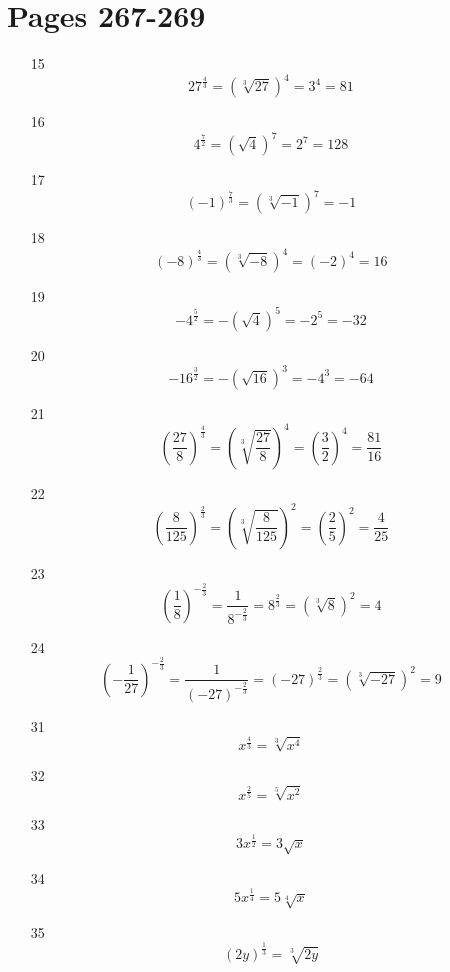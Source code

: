 \documentclass[fleqn,addpoints]{exam}
\begin{document}
\section{Pages 267-269}
\begin{itemize}

\item[15]
\[
  27^{\frac{4}{3}} = (\sqrt[3]{27})^4 = 3^4 = 81
\]

\item[16]
\[
  4^{\frac{7}{2}} = (\sqrt{4})^7 = 2^7 = 128
\]

\item[17]
\[
  (-1)^{\frac{7}{3}} = (\sqrt[3]{-1})^7= -1
\]

\item[18]
\[
  (-8)^{\frac{4}{3}} = (\sqrt[3]{-8})^4 = (-2)^4 = 16
\]

\item[19]
\[
  -4^{\frac{5}{2}} = -(\sqrt{4})^5 = -2^5 = -32
\]

\item[20]
\[
  -16^{\frac{3}{2}} = -(\sqrt{16})^3 = -4^3 = -64
\]

\item[21]
\[
  \left( \frac{27}{8} \right)^{\frac{4}{3}} = \left( \sqrt[3]{\frac{27}{8}} \right)^4 = \left( \frac{3}{2} \right)^4 = \frac{81}{16}
\]

\item[22]
\[
  \left( \frac{8}{125} \right)^{\frac{2}{3}} = \left( \sqrt[3]{\frac{8}{125}} \right)^2 = \left( \frac{2}{5} \right)^2 = \frac{4}{25}
\]

\item[23]
\[
  \left( \frac{1}{8} \right)^{-\frac{2}{3}} = \frac{1}{8^{-\frac{2}{3}} } = 8^{\frac{2}{3}} = (\sqrt[3]{8})^2 = 4
\]

\item[24]
\[
  \left( - \frac{1}{27} \right)^{-\frac{2}{3}} = \frac{1}{(-27)^{-\frac{2}{3}} } = (-27)^{\frac{2}{3}} = (\sqrt[3]{-27})^2 = 9
\]

\item[31]
\[
  x^{\frac{4}{3}} = \sqrt[3]{x^4}
\]

\item[32]
\[
  x^{\frac{2}{5}} = \sqrt[5]{x^2}
\]

\item[33]
\[
  3x^{\frac{1}{2}} = 3 \sqrt{x}
\]

\item[34]
\[
  5x^{\frac{1}{4}} = 5 \sqrt[4]{x}
\]

\item[35]
\[
  (2y)^\frac{1}{3} = \sqrt[3]{2y}
\]


\end{itemize}
\end{document}
